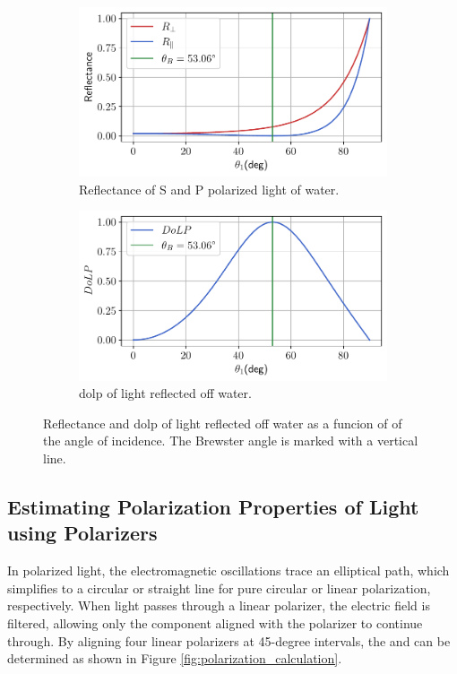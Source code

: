 \begin{figure}[H]
    \centering
    \begin{subfigure}{.5\textwidth}
        \centering
        \includegraphics[width=\textwidth]{figures/pol_plots/brewster0.pdf}
        \caption{Reflectance of S and P polarized light of water.}
        \label{fig:brewster0}
    \end{subfigure}%
    \begin{subfigure}{.5\textwidth}
        \centering
        \includegraphics[width=\textwidth]{figures/pol_plots/brewster1.pdf}
        \caption{\gls{dolp} of light reflected off water.}
        \label{fig:brewster1}
    \end{subfigure}
    \caption{Reflectance and \gls{dolp} of light reflected off water as a funcion of of the angle of incidence.
        The Brewster angle is marked with a vertical line.}
    \label{fig:test}
\end{figure}




\subsection{Estimating Polarization Properties of Light using Polarizers}
In polarized light, the electromagnetic oscillations trace an elliptical path, which simplifies to a circular or straight line for pure circular or linear polarization, respectively.
When light passes through a linear polarizer, the electric field is filtered, allowing only the component aligned with the polarizer to continue through.
By aligning four linear polarizers at 45-degree intervals, the  and  can be determined as shown in Figure \ref{fig:polarization_calculation}.

